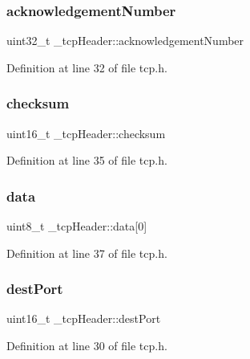 \subsubsection{\texorpdfstring{acknowledgement\+Number}{acknowledgementNumber}}
{\footnotesize\ttfamily uint32\+\_\+t \+\_\+tcp\+Header\+::acknowledgement\+Number}



Definition at line 32 of file tcp.\+h.

\mbox{\label{struct__tcpHeader_a0906fe118aa70365e0820e171c75119b}} 
\subsubsection{\texorpdfstring{checksum}{checksum}}
{\footnotesize\ttfamily uint16\+\_\+t \+\_\+tcp\+Header\+::checksum}



Definition at line 35 of file tcp.\+h.

\mbox{\label{struct__tcpHeader_aede9eb26ef4f1a85dc3491029ee4baac}} 
\subsubsection{\texorpdfstring{data}{data}}
{\footnotesize\ttfamily uint8\+\_\+t \+\_\+tcp\+Header\+::data\mbox{[}0\mbox{]}}



Definition at line 37 of file tcp.\+h.

\mbox{\label{struct__tcpHeader_a5484a2aa2e860b1f226a7014ae402d3e}} 
\subsubsection{\texorpdfstring{dest\+Port}{destPort}}
{\footnotesize\ttfamily uint16\+\_\+t \+\_\+tcp\+Header\+::dest\+Port}



Definition at line 30 of file tcp.\+h.


